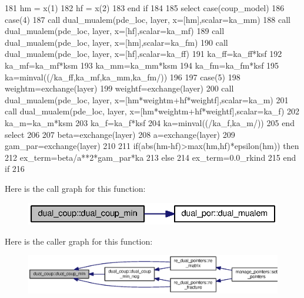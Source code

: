 \begin{DoxyCode}
181            hm = x(1)
182            hf = x(2)
183 \textcolor{keywordflow}{     end if}
184           
185      \textcolor{keywordflow}{select case}(coup_model)
186            \textcolor{keywordflow}{case}(4)
187                  \textcolor{keyword}{call }dual\_mualem(pde\_loc, layer, x=[hm],scalar=ka\_mm)
188                  \textcolor{keyword}{call }dual\_mualem(pde\_loc, layer, x=[hf],scalar=ka\_mf)
189                  \textcolor{keyword}{call }dual\_mualem(pde\_loc, layer, x=[hm],scalar=ka\_fm)
190                  \textcolor{keyword}{call }dual\_mualem(pde\_loc, layer, x=[hf],scalar=ka\_ff)
191                  ka\_ff=ka\_ff*ksf
192                  ka\_mf=ka\_mf*ksm
193                  ka\_mm=ka\_mm*ksm
194                  ka\_fm=ka\_fm*ksf
195                  ka=minval((/ka\_ff,ka\_mf,ka\_mm,ka\_fm/))
196 
197        \textcolor{keywordflow}{case}(5)
198          weightm=exchange(layer)%
199          weightf=exchange(layer)%
200          \textcolor{keyword}{call }dual\_mualem(pde\_loc, layer, x=[hm*weightm+hf*weightf],scalar\textcolor{comment}{=ka\_m)}
201 \textcolor{comment}{         }\textcolor{keyword}{call }dual\_mualem(pde\_loc, layer, x=[hm*weightm+hf*weightf],scalar\textcolor{comment}{=ka\_f)}
202 \textcolor{comment}{         ka\_m=ka\_m*ksm}
203 \textcolor{comment}{         ka\_f=ka\_f*ksf}
204 \textcolor{comment}{                 ka=minval((/ka\_f,ka\_m/))}
205 \textcolor{comment}{}\textcolor{keywordflow}{    end select}
206     
207      beta=exchange(layer)%
208      a=exchange(layer)%
209      gam\_par=exchange(layer)%
210      
211      \textcolor{keywordflow}{if}(abs(hm-hf)>max(hm,hf)*epsilon(hm)) \textcolor{keywordflow}{then}
212        ex\_term=beta/a**2*gam\_par*ka
213      \textcolor{keywordflow}{else}
214        ex\_term=0.0\_rkind
215 \textcolor{keywordflow}{     end if}
216 
\end{DoxyCode}


Here is the call graph for this function\+:
\nopagebreak
\begin{figure}[H]
\begin{center}
\leavevmode
\includegraphics[width=329pt]{namespacedual__coup_a6ff2a1e14fda6be9ae0ac50bc2cc8f76_cgraph}
\end{center}
\end{figure}




Here is the caller graph for this function\+:\nopagebreak
\begin{figure}[H]
\begin{center}
\leavevmode
\includegraphics[width=350pt]{namespacedual__coup_a6ff2a1e14fda6be9ae0ac50bc2cc8f76_icgraph}
\end{center}
\end{figure}


